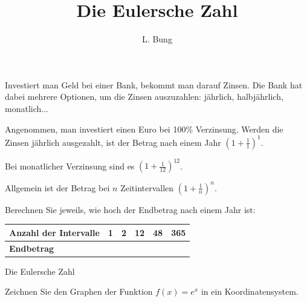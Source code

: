 \documentclass[11pt, a4paper, oneside]{article}
\begin{document}
	\author{L. Bung}
	\title{Die Eulersche Zahl}
	\subject{Mathematik}
	\maketitle
	
	Investiert man Geld bei einer Bank, bekommt man darauf Zinsen.
	Die Bank hat dabei mehrere Optionen, um die Zinsen auszuzahlen:
	jährlich, halbjährlich, monatlich...
	
	Angenommen, man investiert einen Euro bei 100\% Verzinsung.
	Werden die Zinsen jährlich ausgezahlt, ist der Betrag nach einem Jahr
	$\displaystyle\left(1 + \frac{1}{1}\right)^1$.
	
	Bei monatlicher Verzinsung sind es
	$\displaystyle\left(1 + \frac{1}{12}\right)^{12}$.
	
	Allgemein ist der Betrag bei $n$ Zeitintervallen
	$\displaystyle\left(1 + \frac{1}{n}\right)^n$.
	
	
	Berechnen Sie jeweils, wie hoch der Endbetrag nach einem Jahr ist:
	
	\begin{table}[h]
		\centering
		\begin{tabular}{|p{4cm}||p{1.5cm}|p{1.5cm}|p{1.5cm}|p{1.5cm}|p{1.5cm}|}
			\hline
			\textbf{Anzahl der Intervalle} & 1 & 2 & 12 & 48 & 365\\
			\hline\hline
			\textbf{Endbetrag} &&&&&\\
			\hline
		\end{tabular}
	\end{table}
	
	\begin{hint}{Die Eulersche Zahl}
		\phantom{x}\vspace{6cm}
	\end{hint}
	
	
	Zeichnen Sie den Graphen der Funktion $f(x)=e^x$ in ein Koordinatensystem.
	
\end{document}
